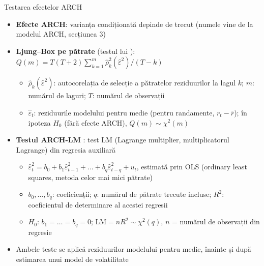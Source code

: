 \begin{frame}{Testarea efectelor ARCH}
\itemsize{\small}
\begin{itemize}
    \item \textbf{Efecte ARCH}: varianța condiționată depinde de trecut (numele vine de la modelul ARCH, secțiunea 3)
    \item \textbf{Ljung--Box pe pătrate} (testul lui ): $Q(m) = T(T+2)\sum_{k=1}^{m}\hat\rho_k^2(\hat\varepsilon^2)/(T-k)$
    \begin{itemize}
        \item $\hat\rho_k(\hat\varepsilon^2)$: autocorelația de selecție a pătratelor reziduurilor la lagul $k$; $m$: numărul de laguri; $T$: numărul de observații
        \item $\hat\varepsilon_t$: reziduurile modelului pentru medie (pentru randamente, $r_t - \bar r$); în ipoteza $H_0$ (fără efecte ARCH), $Q(m) \sim \chi^2(m)$
    \end{itemize}
    \item \textbf{Testul ARCH-LM} : test LM (Lagrange multiplier, multiplicatorul Lagrange) din regresia auxiliară
    \begin{itemize}
        \item $\hat\varepsilon_t^2 = b_0 + b_1\hat\varepsilon_{t-1}^2 + \dots + b_q\hat\varepsilon_{t-q}^2 + u_t$, estimată prin OLS (ordinary least squares, metoda celor mai mici pătrate)
        \item $b_0, \dots, b_q$: coeficienții; $q$: numărul de pătrate trecute incluse; $R^2$: coeficientul de determinare al acestei regresii
        \item $H_0$: $b_1 = \dots = b_q = 0$; $\mathrm{LM} = n R^2 \sim \chi^2(q)$, $n$ = numărul de observații din regresie
    \end{itemize}
    \item Ambele teste se aplică reziduurilor modelului pentru medie, înainte și după estimarea unui model de volatilitate
\end{itemize}
\end{frame}

